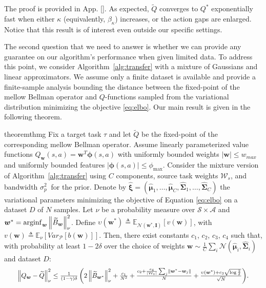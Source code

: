 \documentclass{article}
\newcommand{\arginf}{\operatornamewithlimits{arginf}}
\newcommand{\wt}[1]{\widetilde{#1}}
\newcommand{\wh}[1]{\widehat{#1}}
\newcommand{\norm}[1]{\left\lVert #1 \right\rVert}
\newcommand{\abs}[1]{\left\lvert #1 \right\rvert}
\begin{document}
The proof is provided in App. \ref{}. As expected, $\wt{Q}$ converges to $Q^*$ exponentially fast when either $\kappa$ (equivalently, $\beta_{\kappa}$) increases, or the action gaps are enlarged. Notice that this result is of interest even outside our specific settings.

The second question that we need to answer is whether we can provide any guarantee on our algorithm's performance when given limited data. To address this point, we consider Algorithm~\ref{alg:transfer} with a mixture of Gaussians and linear approximators. We assume only a finite dataset is available and provide a finite-sample analysis bounding the distance between the fixed-point of the mellow Bellman operator and $Q$-functions sampled from the variational distribution minimizing the objective \eqref{eq:elbo}. Our main result is given in the following theorem.

\begin{restatable}{theorem}{thmg} \label{th:main-mixture}
Fix a target task $\tau$ and let $\wt{Q}$ be the fixed-point of the corresponding mellow Bellman operator. Assume linearly parameterized value functions $Q_{\bm{w}}(s,a)=\bm{w}^T\bm{\phi}(s,a)$ with uniformly bounded weights $|\bm{w}|\leq w_{max}$ and uniformly bounded features $|\bm{\phi}(s,a)|\leq \phi_{\max}$. Consider the mixture version of Algorithm~\ref{alg:transfer} using $C$ components, source task weights $\mathcal{W}_s$, and bandwidth $\sigma^2_p\ $ for the prior. Denote by $\wh{\bm{\xi}} = (\wh{\bm{\mu}}_1,\dots,\wh{\bm{\mu}}_C,\wh{\bm{\Sigma}}_1,\dots,\wh{\bm{\Sigma}}_C)$ the variational parameters minimizing the objective of Equation \eqref{eq:elbo} on a dataset $D$ of $N$ samples. Let $\nu$ be a probability measure over $\mathcal{S}\times\mathcal{A}$ and $\bm{w}^* = \arginf_{\bm{w}}\norm{\wt{B}_{\bm{w}}}_{\nu}^2$. Define $\upsilon(\bm{w}^*) \triangleq \mathbb{E}_{\mathcal{N}(\bm{w}^*,\bm{I})}\left[ v(\bm{w}) \right]$, with $v(\bm{w}) \triangleq \mathbb{E}_{\nu}\left[Var_{\mathcal{P}}\left[b(\bm{w})\right]\right]$. Then, there exist constants $c_1$, $c_2$, $c_3$, $c_4$ such that, with probability at least $1-2\delta$ over the choice of weights $\bm{w} \sim \frac{1}{C}\sum_i\mathcal{N}(\wh{\bm{\mu}}_i,\wh{\bm{\Sigma}}_i)$ and dataset $D$:
\begin{equation}
\resizebox{0.93\textwidth}{!}{$
\norm{Q_{\bm{w}} - \wt{Q}}_{\nu}^2 \leq \frac{1}{(1-\gamma)\delta}\left(2\norm{\wt{B}_{\bm{w}^{*}}}_{\nu}^2 + \frac{c_1}{N^2} + \frac{c_2 + \frac{c_4}{\abs{\mathcal{W}_s}}\sum_{j}\norm{\bm{w}^* - \bm{w}_{j}}}{N} + \frac{\upsilon(\bm{w}^*) + c_3\sqrt{\log\frac{2}{\delta}}}{\sqrt{N}}\right)$}.
\end{equation}
\end{restatable}
\end{document}
